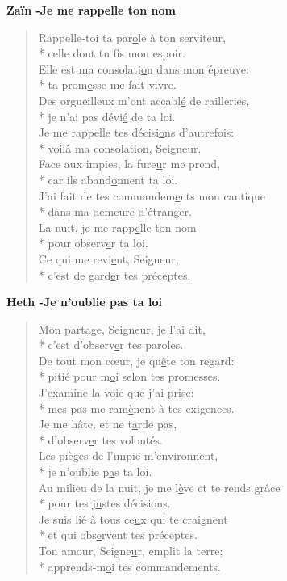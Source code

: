 \textbf{Zaïn -Je me rappelle ton nom}
\begin{verse}
Rappelle-toi ta par\underline{o}le à ton serviteur, \\*
celle dont tu f\underline{i}s mon espoir. \\
Elle est ma consolati\underline{o}n dans mon épreuve: \\*
ta prom\underline{e}sse me fait vivre. \\
Des orgueilleux m’ont accabl\underline{é} de railleries, \\*
je n’ai pas dévi\underline{é} de ta loi. \\
Je me rappelle tes décisi\underline{o}ns d’autrefois: \\*
voilà ma consolati\underline{o}n, Seigneur. \\
Face aux impies, la fure\underline{u}r me prend, \\*
car ils aband\underline{o}nnent ta loi. \\
J’ai fait de tes commandem\underline{e}nts mon cantique \\*
dans ma deme\underline{u}re d’étranger. \\
La nuit, je me rapp\underline{e}lle ton nom \\*
pour observ\underline{e}r ta loi. \\
Ce qui me revi\underline{e}nt, Seigneur, \\*
c’est de gard\underline{e}r tes préceptes. \\
\end{verse}
\textbf{Heth -Je n’oublie pas ta loi}
\begin{verse}
Mon partage, Seigne\underline{u}r, je l’ai dit, \\*
c’est d’observ\underline{e}r tes paroles. \\
De tout mon cœur, je qu\underline{ê}te ton regard: \\*
pitié pour m\underline{o}i selon tes promesses. \\
J’examine la v\underline{o}ie que j’ai prise: \\*
mes pas me ram\underline{è}nent à tes exigences. \\
Je me hâte, et ne t\underline{a}rde pas, \\*
d’observ\underline{e}r tes volontés. \\
Les pièges de l’imp\underline{i}e m’environnent, \\*
je n’oublie p\underline{a}s ta loi. \\
Au milieu de la nuit, je me l\underline{è}ve et te rends grâce \\*
pour tes j\underline{u}stes décisions. \\
Je suis lié à tous ce\underline{u}x qui te craignent \\*
et qui obs\underline{e}rvent tes préceptes. \\
Ton amour, Seigne\underline{u}r, emplit la terre; \\*
apprends-m\underline{o}i tes commandements. \\
\end{verse}

